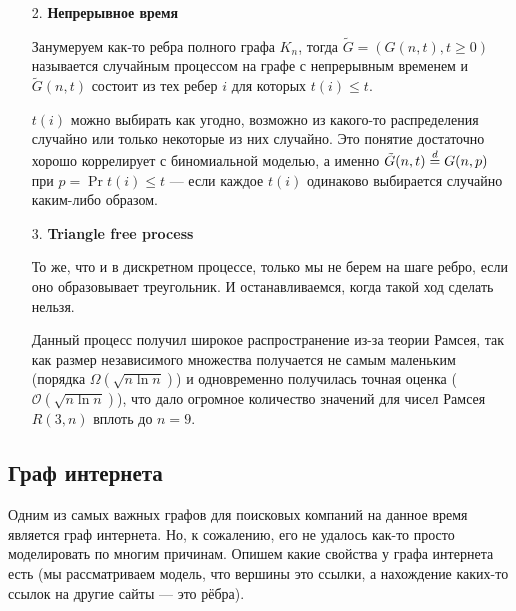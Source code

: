 \begin{itemize}
  \item[2.] \textbf{Непрерывное время}

  \begin{definition}
    Занумеруем как-то ребра полного графа $K_n$, тогда $\tilde{G} = (G(n, t), t \geq 0)$
    называется случайным процессом на графе с непрерывным временем и $\tilde{G}(n, t)$
    состоит из тех ребер $i$ для которых $t(i) \leq t$.
  \end{definition}

  $t(i)$ можно выбирать как угодно, возможно из какого-то распределения случайно
  или только некоторые из них случайно. Это понятие достаточно хорошо коррелирует
  с биномиальной моделью, а именно $\tilde{G}(n, t) \overset{d}{=} G(n, p)$ при $p = 
  \Pr{t(i) \leq t}$ --- если каждое $t(i)$ одинаково выбирается случайно каким-либо
  образом.

  \item[3.] \textbf{Triangle free process}

  То же, что и в дискретном процессе, только мы не берем на шаге ребро, если
  оно образовывает треугольник. И останавливаемся, когда такой ход сделать нельзя.

  Данный процесс получил широкое распространение из-за теории Рамсея, так как
  размер независимого множества получается не самым маленьким (порядка $\Omega(\sqrt{n \ln n})$) и
  одновременно получилась точная оценка ($\mathcal{O}(\sqrt{n \ln n})$), что дало огромное
  количество значений для чисел Рамсея $R(3, n)$ вплоть до $n = 9$.
\end{itemize}

\subsection{Граф интернета}

Одним из самых важных графов для поисковых компаний на данное время является
граф интернета. Но, к сожалению, его не удалось как-то просто моделировать по многим
причинам. Опишем какие свойства у графа интернета есть (мы рассматриваем модель,
что вершины это ссылки, а нахождение каких-то ссылок на другие сайты --- это рёбра).


